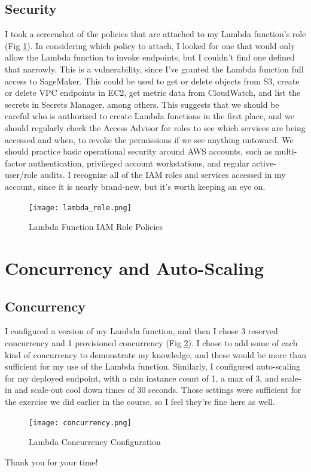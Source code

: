 \documentclass[11pt]{amsart}
\begin{document}
\subsection{Security}
I took a screenshot of the policies that are attached to my Lambda function's role (Fig \ref{fig:role}). In considering which policy to attach, I looked for one that would only allow the Lambda function to invoke endpoints, but I couldn't find one defined that narrowly. This is a vulnerability, since I've granted the Lambda function full access to SageMaker. This could be used to get or delete objects from S3, create or delete VPC endpoints in EC2, get metric data from CloudWatch, and list the secrets in Secrets Manager, among others. This suggests that we should be careful who is authorized to create Lambda functions in the first place, and we should regularly check the Access Advisor for roles to see which services are being accessed and when, to revoke the permissions if we see anything untoward. We should practice basic operational security around AWS accounts, such as multi-factor authentication, privileged account workstations, and regular active-user/role audits. I recognize all of the IAM roles and services accessed in my account, since it is nearly brand-new, but it's worth keeping an eye on.
\begin{figure}[h]
\texttt{[image: lambda\_role.png]}
\caption{Lambda Function IAM Role Policies}
\label{fig:role}
\end{figure}
\section{Concurrency and Auto-Scaling}
\subsection{Concurrency}
I configured a version of my Lambda function, and then I chose 3 reserved concurrency and 1 provisioned concurrency (Fig \ref{fig:concur}). I chose to add some of each kind of concurrency to demonstrate my knowledge, and these would be more than sufficient for my use of the Lambda function. Similarly, I configured auto-scaling for my deployed endpoint, with a min instance count of 1, a max of 3, and scale-in and scale-out cool down times of 30 seconds. Those settings were sufficient for the exercise we did earlier in the course, so I feel they're fine here as well.
\begin{figure}[h]
\texttt{[image: concurrency.png]}
\caption{Lambda Concurrency Configuration}
\label{fig:concur}
\end{figure}

\vspace*{1in}
{\Large Thank you for your time!}
\end{document}
